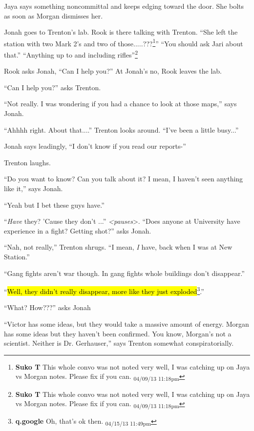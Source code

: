Jaya says something noncommittal and keeps edging toward the door.  She bolts as soon as Morgan dismisses her.



Jonah goes to Trenton's lab.  Rook is there talking with Trenton.  ``She left the station with two Mark 2's and two of those.....???\footnote{\textbf{Suko T }This whole convo was not noted very well, I was catching up on Jaya vs Morgan notes.  Please fix if you can. \textsubscript{04/09/13 11:18pm}}''  ``You should ask Jari about that.'' ``Anything up to and including rifles''\footnote{\textbf{Suko T }This whole convo was not noted very well, I was catching up on Jaya vs Morgan notes.  Please fix if you can. \textsubscript{04/09/13 11:18pm}}  

Rook asks Jonah, ``Can I help you?''  At Jonah's no, Rook leaves the lab.

``Can I help you?'' asks Trenton.

``Not really.  I was wondering if you had a chance to look at those maps,'' says Jonah.

``Ahhhh right.  About that....'' Trenton looks around.  ``I've been a little busy...''

Jonah says leadingly, ``I don't know if you read our reports-''

Trenton laughs.  

``Do you want to know?  Can you talk about it?  I mean, I haven't seen anything like it,'' says Jonah.

``Yeah but I bet these guys have.''

``\textit{Have} they?  'Cause they don't ...'' \textit{\textless pauses}\textgreater .  ``Does anyone at University have experience in a fight?  Getting shot?'' asks Jonah.

``Nah, not really,'' Trenton shrugs.  ``I mean, \textit{I} have, back when I was at New Station.''

``Gang fights aren't war though.  In gang fights whole buildings don't disappear.''

``\hl{Well, they didn't really disappear, more like they just exploded}\footnote{\textbf{q.google }Oh, that's ok then. \textsubscript{04/15/13 11:49pm}}.''

``What?  How???'' asks Jonah

``Victor has some ideas, but they would take a massive amount of energy.  Morgan has some ideas but they haven't been confirmed.  You know, Morgan's not a scientist.  Neither is Dr. Gerhauser,'' says Trenton somewhat conspiratorially.

